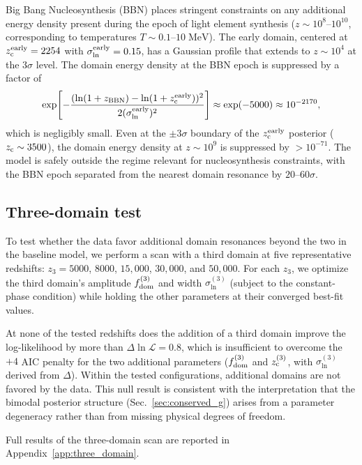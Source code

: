 \documentclass[aps,prd,twocolumn,superscriptaddress,nofootinbib]{revtex4-2}
\newcommand{\fdom}{f_{\rm dom}}
\newcommand{\zc}{z_{\rm c}}
\newcommand{\sln}{\sigma_{\ln}}
\begin{document}
Big Bang Nucleosynthesis (BBN) places stringent constraints on any
additional energy density present during the epoch of light element
synthesis ($z \sim 10^8$--$10^{10}$, corresponding to temperatures
$T \sim 0.1$--$10\;\mathrm{MeV}$). The early domain, centered at
$\zc^{\rm early} = 2254$ with $\sln^{\rm early} = 0.15$, has a
Gaussian profile that extends to $z \sim 10^4$ at the $3\sigma$ level.
The domain energy density at the BBN epoch is suppressed by a factor
of
\begin{equation}
\exp\!\left[-\frac{(\ln(1 + z_{\rm BBN}) - \ln(1 + \zc^{\rm
    early}))^2}{2(\sln^{\rm early})^2}\right]
\approx \exp(-5000) \approx 10^{-2170},
\label{eq:bbn_suppression}
\end{equation}
which is negligibly small. Even at the $\pm 3\sigma$ boundary of the
$\zc^{\rm early}$ posterior ($\zc \sim 3500$), the domain energy
density at $z \sim 10^9$ is suppressed by $> 10^{-71}$. The model is
safely outside the regime relevant for nucleosynthesis constraints,
with the BBN epoch separated from the nearest domain resonance by
$20$--$60\sigma$.

\subsection{Three-domain test}
\label{sec:three_domain}

To test whether the data favor additional domain resonances beyond the
two in the baseline model, we perform a scan with a third domain at
five representative redshifts: $z_3 = 5000$, $8000$, $15{,}000$,
$30{,}000$, and $50{,}000$. For each $z_3$, we optimize the third
domain's amplitude $\fdom^{(3)}$ and width $\sln^{(3)}$ (subject to
the constant-phase condition) while holding the other parameters at
their converged best-fit values.

At none of the tested redshifts does the addition of a third domain
improve the log-likelihood by more than $\Delta \ln \mathcal{L} =
0.8$, which is insufficient to overcome the $+4$ AIC penalty for the
two additional parameters ($\fdom^{(3)}$ and $\zc^{(3)}$, with
$\sln^{(3)}$ derived from $\Delta$). Within the tested
configurations, additional domains are not favored by the data. This
null result is consistent with the interpretation that the bimodal
posterior structure (Sec.~\ref{sec:conserved_g}) arises from a
parameter degeneracy rather than from missing physical degrees of
freedom.

Full results of the three-domain scan are reported in
Appendix~\ref{app:three_domain}.
\end{document}
